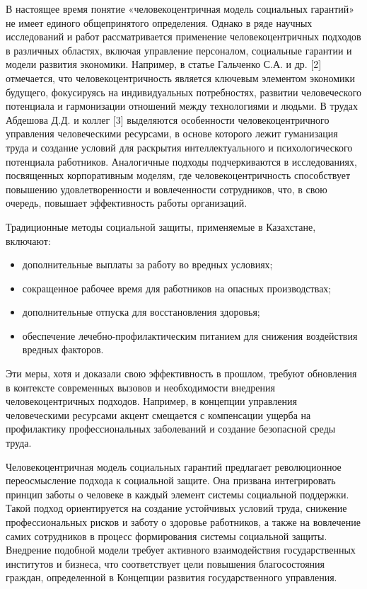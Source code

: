 \begin{multicols}{2}
В настоящее время понятие «человекоцентричная модель социальных
гарантий» не имеет единого общепринятого определения. Однако в ряде
научных исследований и работ рассматривается применение
человекоцентричных подходов в различных областях, включая управление
персоналом, социальные гарантии и модели развития экономики. Например, в
статье Гальченко С.А. и др. {[}2{]} отмечается, что человекоцентричность
является ключевым элементом экономики будущего, фокусируясь на
индивидуальных потребностях, развитии человеческого потенциала и
гармонизации отношений между технологиями и людьми\hspace{0pt}. В трудах
Абдешова Д.Д. и коллег {[}3{]} выделяются особенности
человекоцентричного управления человеческими ресурсами, в основе
которого лежит гуманизация труда и создание условий для раскрытия
интеллектуального и психологического потенциала работников.
Аналогичные подходы подчеркиваются в исследованиях, посвященных
корпоративным моделям, где человекоцентричность способствует повышению
удовлетворенности и вовлеченности сотрудников, что, в свою очередь,
повышает эффективность работы организаций\hspace{0pt}\hspace{0pt}.

Традиционные методы социальной защиты, применяемые в Казахстане,
включают:

\begin{itemize}
\item
  дополнительные выплаты за работу во вредных условиях;
\item
  сокращенное рабочее время для работников на опасных производствах;
\item
  дополнительные отпуска для восстановления здоровья;
\item
  обеспечение лечебно-профилактическим питанием для снижения воздействия
  вредных факторов\hspace{0pt}\hspace{0pt}.
\end{itemize}

Эти меры, хотя и доказали свою эффективность в прошлом, требуют
обновления в контексте современных вызовов и необходимости внедрения
человекоцентричных подходов. Например, в концепции управления
человеческими ресурсами акцент смещается с компенсации ущерба на
профилактику профессиональных заболеваний и создание безопасной среды
труда\hspace{0pt}\hspace{0pt}.

Человекоцентричная модель социальных гарантий предлагает революционное
переосмысление подхода к социальной защите. Она призвана интегрировать
принцип заботы о человеке в каждый элемент системы социальной поддержки.
Такой подход ориентируется на создание устойчивых условий труда,
снижение профессиональных рисков и заботу о здоровье работников, а также
на вовлечение самих сотрудников в процесс формирования системы
социальной защиты. Внедрение подобной модели требует активного
взаимодействия государственных институтов и бизнеса, что соответствует
цели повышения благосостояния граждан, определенной в Концепции развития
государственного управления.


\end{multicols}
